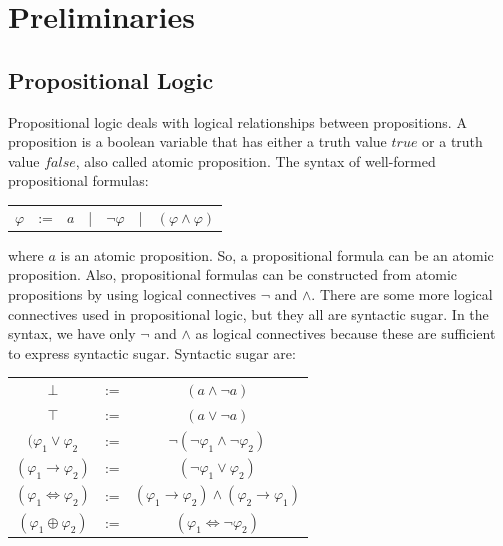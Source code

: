 \chapter{Preliminaries}
\label{chap:Preliminaries}
\section{Propositional Logic}
\label{sec:PropositionalLogic}
Propositional logic deals with logical relationships between propositions.
A proposition is a boolean variable that has either a truth value $\mathit{true}$ or a truth value $\mathit{false}$, also called atomic proposition.
The syntax of well-formed propositional formulas:\newline

\begin{table}[!ht]
\centering
\begin{tabular}{lllllll}
$\mathit{\varphi}$ & := & $\mathit{a}$ & | & $\neg \mathit{\varphi}$ & | & $( \mathit{\varphi} \wedge \mathit{\varphi} )$
\end{tabular}
\end{table}

\noindent where $\mathit{a}$ is an atomic proposition.
So, a propositional formula can be an atomic proposition.
Also, propositional formulas can be constructed from atomic propositions by using logical connectives $\neg$ and $\wedge$.
There are some more logical connectives used in propositional logic, but they all are syntactic sugar.
In the syntax, we have only $\neg$ and $\wedge$ as logical connectives because these are sufficient to express syntactic sugar.
Syntactic sugar are:\newline

\begin{table}[!ht]
\centering
\begin{tabular}{ccc}
$\bot$                   & := & $( \mathit{a} \wedge \neg \mathit{a} )$ \\
$\top$                   & := & $( \mathit{a} \vee \neg \mathit{a} )$  \\
$( \mathit{\varphi_{1}} \vee \mathit{\varphi_{2}}$      & := & $\neg ( \neg \mathit{\varphi_{1}} \wedge \neg \mathit{\varphi_{2}} )$     \\
$( \mathit{\varphi_{1}} \to \mathit{\varphi_{2}} )$ & := & $( \mathit{\neg \varphi_{1}} \vee \mathit{\varphi_{2}} )$     \\
$( \mathit{\varphi_{1}} \Leftrightarrow \mathit{\varphi_{2}} )$       & := & $( \mathit{\varphi_{1}} \to \mathit{\varphi_{2}} ) \wedge ( \mathit{\varphi_{2}} \to \mathit{\varphi_{1}} )$     \\
$( \mathit{\varphi_{1}} \oplus \mathit{\varphi_{2}} )$      & := & $( \varphi_{1} \Leftrightarrow \neg \varphi_{2} )$     
\end{tabular}
\end{table}

